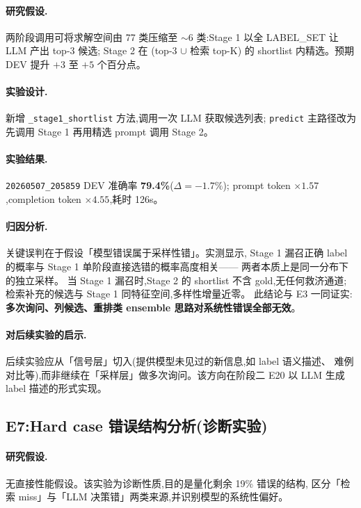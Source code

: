 \documentclass[11pt,a4paper]{ctexart}
\begin{document}
\paragraph{研究假设.}两阶段调用可将求解空间由 77 类压缩至 $\sim 6$ 类:Stage 1 以全 LABEL\_SET 让 LLM 产出 top-3 候选;
Stage 2 在 (top-3 $\cup$ 检索 top-K) 的 shortlist 内精选。预期 DEV 提升 $+3$ 至 $+5$ 个百分点。

\paragraph{实验设计.}新增 \texttt{\_stage1\_shortlist} 方法,调用一次 LLM 获取候选列表;
\texttt{predict} 主路径改为先调用 Stage 1 再用精选 prompt 调用 Stage 2。

\paragraph{实验结果.}\texttt{20260507\_205859} DEV 准确率 \textbf{79.4\%}($\Delta = -1.7\%$);
prompt token $\times 1.57$,completion token $\times 4.55$,耗时 126s。

\paragraph{归因分析.}关键误判在于假设「模型错误属于采样性错」。实测显示,
Stage 1 漏召正确 label 的概率与 Stage 1 单阶段直接选错的概率高度相关——
两者本质上是同一分布下的独立采样。
当 Stage 1 漏召时,Stage 2 的 shortlist 不含 gold,无任何救济通道;
检索补充的候选与 Stage 1 同特征空间,多样性增量近零。
此结论与 E3 一同证实:\textbf{多次询问、列候选、重排类 ensemble 思路对系统性错误全部无效}。

\paragraph{对后续实验的启示.}后续实验应从「信号层」切入(提供模型未见过的新信息,如 label 语义描述、
难例对比等),而非继续在「采样层」做多次询问。该方向在阶段二 E20 以 LLM 生成 label 描述的形式实现。

\subsection{E7:Hard case 错误结构分析(诊断实验)}

\paragraph{研究假设.}无直接性能假设。该实验为诊断性质,目的是量化剩余 19\% 错误的结构,
区分「检索 miss」与「LLM 决策错」两类来源,并识别模型的系统性偏好。
\end{document}
